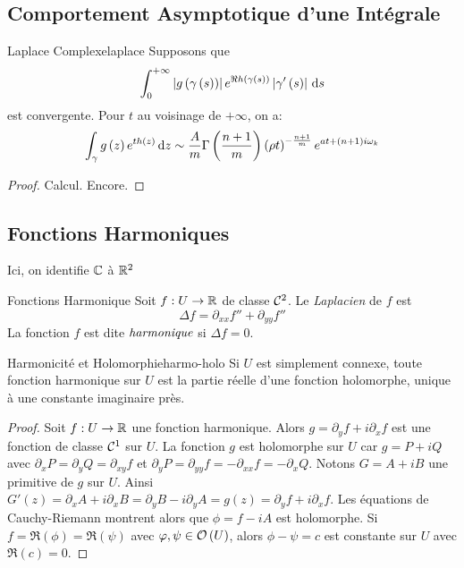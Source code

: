 \documentclass{cours}
\begin{document}
\subsection{Comportement Asymptotique d'une Intégrale}
\begin{théorème}
	{Laplace Complexe}{laplace}
	Supposons que \begin{equation*}
		\int_{0}^{+\infty} \left|g\left(\gamma\left(s\right)\right)\right|e^{\Re h\left(\gamma\left(s\right)\right)}\left|\gamma'\left(s\right)\right|{\rm \, d} s
	\end{equation*}
	est convergente. Pour $t$ au voisinage de $+\infty$, on a: 
	\begin{equation*}
		\int_{\gamma}g\left(z\right)e^{th\left(z\right)}{\rm \, d} z \sim \frac{A}{m}\Gamma\left(\frac{n + 1}{m}\right)\left(\rho t\right)^{-\frac{n + 1}{m}}e^{at + \left(n+1\right)i\omega_{k}}
	\end{equation*}
\end{théorème}
\begin{proof}
	Calcul. Encore.
\end{proof}

\subsection{Fonctions Harmoniques}
Ici, on identifie $\mathbb{C}$ à $\mathbb{R}^{2}$
\begin{définition}
	{Fonctions Harmonique}{}
	Soit $f : U \to \mathbb{R}$ de classe $\mathcal{C}^{2}$. Le \emph{Laplacien} de $f$ est 
	\begin{equation*}
		\Delta f = \partial_{xx}f'' + \partial_{yy}f''
	\end{equation*}
	La fonction $f$ est dite $\emph{harmonique}$ si $\Delta f = 0$.
\end{définition}

\begin{propositionfr}
	{Harmonicité et Holomorphie}{harmo-holo}
	Si $U$ est simplement connexe, toute fonction harmonique sur $U$ est la partie réelle d'une fonction holomorphe, unique à une constante imaginaire près. 
\end{propositionfr}
\begin{proof}
	Soit $f: U \to \mathbb{R}$ une fonction harmonique. 
	Alors $g = \partial_{y}f + i\partial_{x}f$ est une fonction de classe $\mathcal{C}^{1}$ sur $U$. 
	La fonction $g$ est holomorphe sur $U$ car $g = P + iQ$ avec $\partial_{x}P = \partial_{y}Q = \partial_{xy}f$ et $\partial_{y}P = \partial_{yy}f = -\partial_{xx}f = -\partial_{x}Q$. 
	Notons $G = A +iB$ une primitive de $g$ sur $U$. 
	Ainsi $G'\left(z\right) = \partial_{x}A + i\partial_{x}B = \partial_{y}B -i\partial_{y}A = g\left(z\right) = \partial_{y}f + i\partial_{x}f$.
	Les équations de Cauchy-Riemann montrent alors que $\phi = f - iA$ est holomorphe. Si $f = \Re\left(\phi\right) = \Re\left(\psi\right)$ avec $\varphi, \psi \in \mathcal{O}\left(U\right)$, alors $\phi - \psi = c$ est constante sur $U$ avec $\Re\left(c\right) = 0$. 
\end{proof}
\end{document}
